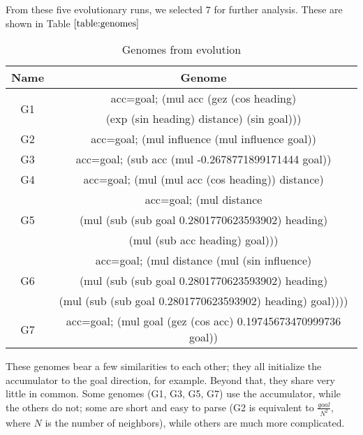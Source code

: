 From these five evolutionary runs, we selected $7$ for further analysis.
These are shown in Table $\ref{table:genomes}$
\begin{table}[h]
\centering
\begin{tabular}{|c|c|}
    \hline
    \textbf{Name} & \textbf{Genome} \\
    \hline
    \multirow{2}{*}{G1} & acc=goal; (mul acc (gez (cos heading) \\
        & (exp (sin heading) distance) (sin goal))) \\ \hline
    G2 & acc=goal; (mul influence (mul influence goal)) \\ \hline
    G3 & acc=goal; (sub acc (mul -0.2678771899171444 goal)) \\ \hline
    G4 & acc=goal; (mul (mul acc (cos heading)) distance) \\ \hline
    \multirow{3}{*}{G5} & acc=goal; (mul distance \\
    &(mul (sub (sub goal 0.2801770623593902) heading) \\
    & (mul (sub acc heading) goal))) \\ \hline
    \multirow{3}{*}{G6} & acc=goal; (mul distance (mul (sin influence) \\
    & (mul (sub (sub goal 0.2801770623593902) heading) \\
    & (mul (sub (sub goal 0.2801770623593902) heading) goal)))) \\ \hline
    G7 & acc=goal; (mul goal (gez (cos acc) 0.19745673470999736 goal)) \\ \hline
\end{tabular}
\caption{Genomes from evolution}
\label{table:genomes}
\end{table}
These genomes bear a few similarities to each other; they all initialize the
accumulator to the goal direction, for example.
Beyond that, they share very little in common.
Some genomes (G1, G3, G5, G7) use the accumulator, while the others do not; some
are short and easy to parse (G2 is equivalent to $\frac{goal}{N^2}$, where
$N$ is the number of neighbors), while others are much more complicated.

